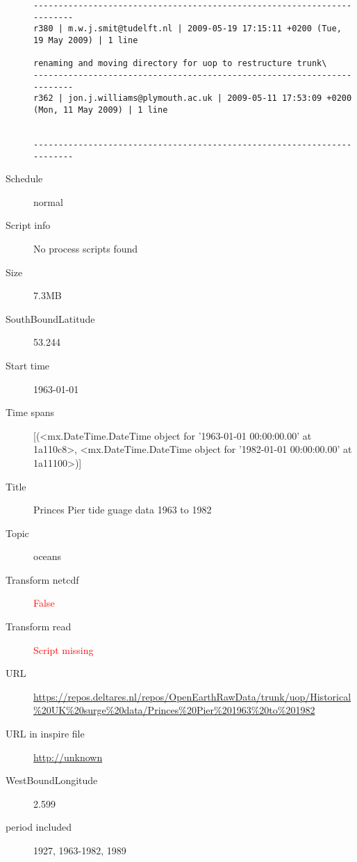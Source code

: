 \documentclass[9]{report}
\begin{document}
\begin{description}
\begin{verbatim}
------------------------------------------------------------------------
r380 | m.w.j.smit@tudelft.nl | 2009-05-19 17:15:11 +0200 (Tue, 19 May 2009) | 1 line

renaming and moving directory for uop to restructure trunk\
------------------------------------------------------------------------
r362 | jon.j.williams@plymouth.ac.uk | 2009-05-11 17:53:09 +0200 (Mon, 11 May 2009) | 1 line


------------------------------------------------------------------------

\end{verbatim}
  \item[Schedule] normal
  \item[Script info] No process scripts found
  \item[Size] 7.3MB
  \item[SouthBoundLatitude] 53.244
  \item[Start time] 1963-01-01
  \item[Time spans] [(<mx.DateTime.DateTime object for '1963-01-01 00:00:00.00' at 1a110c8>, <mx.DateTime.DateTime object for '1982-01-01 00:00:00.00' at 1a11100>)]
  \item[Title]  Princes Pier tide guage data 1963 to 1982 
  \item[Topic] oceans
  \item[Transform netcdf] \textcolor{red}{False}
  \item[Transform read] \textcolor{red}{Script missing}
  \item[URL] \href{https://repos.deltares.nl/repos/OpenEarthRawData/trunk/uop/Historical\%20UK\%20surge\%20data/Princes\%20Pier\%201963\%20to\%201982}{https://repos.deltares.nl/repos/OpenEarthRawData/trunk/uop/Historical\%20UK\%20surge\%20data/Princes\%20Pier\%201963\%20to\%201982}
  \item[URL in inspire file] \href{http://unknown}{http://unknown}
  \item[WestBoundLongitude] 2.599
  \item[period included] 1927, 1963-1982, 1989
\end{description}
\end{document}
